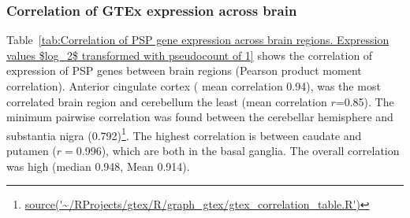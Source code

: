     
    
\subsubsection{Correlation of GTEx expression across brain}

Table~\ref{tab:Correlation of PSP gene expression across brain regions. Expression values $log_2$ transformed with pseudocount of 1} shows the  correlation of expression of PSP genes between brain regions (Pearson product moment correlation). Anterior cingulate cortex ( mean correlation 0.94), was the most correlated brain region and cerebellum the least (mean correlation $r$=0.85). The minimum pairwise correlation was found between the cerebellar hemisphere and substantia nigra (0.792)\footnote{\url{source('~/RProjects/gtex/R/graph_gtex/gtex_correlation_table.R')}}. The highest correlation is between caudate and putamen ($r=$0.996), which are both in the basal ganglia. The overall correlation was high (median 0.948, Mean 0.914).

